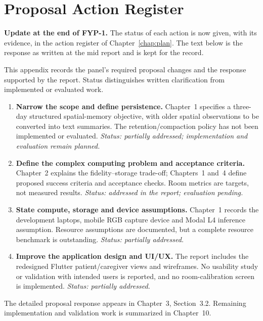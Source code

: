 \chapter{Proposal Action Register}
\label{app:actions}
\textbf{Update at the end of FYP-1.} The status of each action is now given, with its evidence, in the action register of Chapter~\ref{chap:plan}. The text below is the response as written at the mid report and is kept for the record.


This appendix records the panel's required proposal changes and the response
supported by the report. Status distinguishes written clarification from
implemented or evaluated work.

\begin{enumerate}
\item \textbf{Narrow the scope and define persistence.} Chapter~1 specifies a
three-day structured spatial-memory objective, with older spatial observations
to be converted into text summaries. The retention/compaction policy has not
been implemented or evaluated. \emph{Status: partially addressed; implementation
and evaluation remain planned.}

\item \textbf{Define the complex computing problem and acceptance criteria.}
Chapter~2 explains the fidelity--storage trade-off; Chapters~1 and~4 define
proposed success criteria and acceptance checks. Room metrics are targets, not
measured results. \emph{Status: addressed in the report; evaluation pending.}

\item \textbf{State compute, storage and device assumptions.} Chapter~1 records
the development laptops, mobile RGB capture device and Modal L4 inference
assumption. Resource assumptions are documented, but a complete resource
benchmark is outstanding. \emph{Status: partially addressed.}

\item \textbf{Improve the application design and UI/UX.} The report includes
the redesigned Flutter patient/caregiver views and wireframes. No usability
study or validation with intended users is reported, and no room-calibration
screen is implemented. \emph{Status: partially addressed.}
\end{enumerate}

The detailed proposal response appears in Chapter~3, Section~3.2. Remaining
implementation and validation work is summarized in Chapter~10.